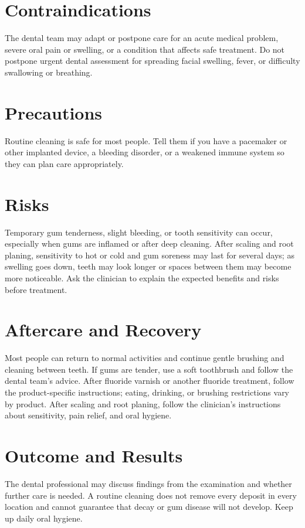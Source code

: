 \section*{Contraindications}
The dental team may adapt or postpone care for an acute medical problem, severe oral pain or swelling, or a condition that affects safe treatment. Do not postpone urgent dental assessment for spreading facial swelling, fever, or difficulty swallowing or breathing.

\section*{Precautions}
Routine cleaning is safe for most people. Tell them if you have a pacemaker or other implanted device, a bleeding disorder, or a weakened immune system so they can plan care appropriately.

\section*{Risks}
Temporary gum tenderness, slight bleeding, or tooth sensitivity can occur, especially when gums are inflamed or after deep cleaning. After scaling and root planing, sensitivity to hot or cold and gum soreness may last for several days; as swelling goes down, teeth may look longer or spaces between them may become more noticeable. Ask the clinician to explain the expected benefits and risks before treatment.

\section*{Aftercare and Recovery}
Most people can return to normal activities and continue gentle brushing and cleaning between teeth. If gums are tender, use a soft toothbrush and follow the dental team's advice. After fluoride varnish or another fluoride treatment, follow the product-specific instructions; eating, drinking, or brushing restrictions vary by product. After scaling and root planing, follow the clinician's instructions about sensitivity, pain relief, and oral hygiene.

\section*{Outcome and Results}
The dental professional may discuss findings from the examination and whether further care is needed. A routine cleaning does not remove every deposit in every location and cannot guarantee that decay or gum disease will not develop. Keep up daily oral hygiene.

